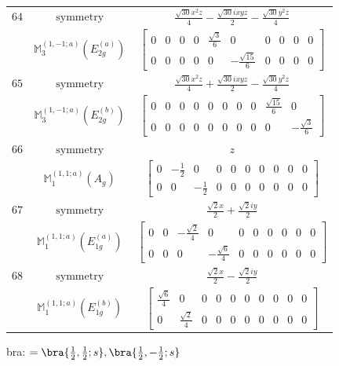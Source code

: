 \documentclass[fleqn,8pt,landscape]{jsarticle}
\begin{document}
\begin{longtable}{ccc}
$ 64 $ & $ \text{symmetry} $ & $ \frac{\sqrt{30} x^{2} z}{4} - \frac{\sqrt{30} i x y z}{2} - \frac{\sqrt{30} y^{2} z}{4} $ \\
$  $ & $ \mathbb{M}_{3}^{(1,-1;a)}(E_{2g}^{(a)}) $ & $ \begin{bmatrix} 0 & 0 & 0 & 0 & \frac{\sqrt{3}}{6} & 0 & 0 & 0 & 0 & 0 \\ 0 & 0 & 0 & 0 & 0 & - \frac{\sqrt{15}}{6} & 0 & 0 & 0 & 0 \end{bmatrix} $ \\ \hline
$ 65 $ & $ \text{symmetry} $ & $ \frac{\sqrt{30} x^{2} z}{4} + \frac{\sqrt{30} i x y z}{2} - \frac{\sqrt{30} y^{2} z}{4} $ \\
$  $ & $ \mathbb{M}_{3}^{(1,-1;a)}(E_{2g}^{(b)}) $ & $ \begin{bmatrix} 0 & 0 & 0 & 0 & 0 & 0 & 0 & 0 & \frac{\sqrt{15}}{6} & 0 \\ 0 & 0 & 0 & 0 & 0 & 0 & 0 & 0 & 0 & - \frac{\sqrt{3}}{6} \end{bmatrix} $ \\ \hline
$ 66 $ & $ \text{symmetry} $ & $ z $ \\
$  $ & $ \mathbb{M}_{1}^{(1,1;a)}(A_{g}) $ & $ \begin{bmatrix} 0 & - \frac{1}{2} & 0 & 0 & 0 & 0 & 0 & 0 & 0 & 0 \\ 0 & 0 & - \frac{1}{2} & 0 & 0 & 0 & 0 & 0 & 0 & 0 \end{bmatrix} $ \\ \hline
$ 67 $ & $ \text{symmetry} $ & $ \frac{\sqrt{2} x}{2} + \frac{\sqrt{2} i y}{2} $ \\
$  $ & $ \mathbb{M}_{1}^{(1,1;a)}(E_{1g}^{(a)}) $ & $ \begin{bmatrix} 0 & 0 & - \frac{\sqrt{2}}{4} & 0 & 0 & 0 & 0 & 0 & 0 & 0 \\ 0 & 0 & 0 & - \frac{\sqrt{6}}{4} & 0 & 0 & 0 & 0 & 0 & 0 \end{bmatrix} $ \\ \hline
$ 68 $ & $ \text{symmetry} $ & $ \frac{\sqrt{2} x}{2} - \frac{\sqrt{2} i y}{2} $ \\
$  $ & $ \mathbb{M}_{1}^{(1,1;a)}(E_{1g}^{(b)}) $ & $ \begin{bmatrix} \frac{\sqrt{6}}{4} & 0 & 0 & 0 & 0 & 0 & 0 & 0 & 0 & 0 \\ 0 & \frac{\sqrt{2}}{4} & 0 & 0 & 0 & 0 & 0 & 0 & 0 & 0 \end{bmatrix} $ \\ \hline
\end{longtable}
bra: $=\bra{\frac{1}{2},\frac{1}{2};s}, \bra{\frac{1}{2},- \frac{1}{2};s}$
\end{document}
